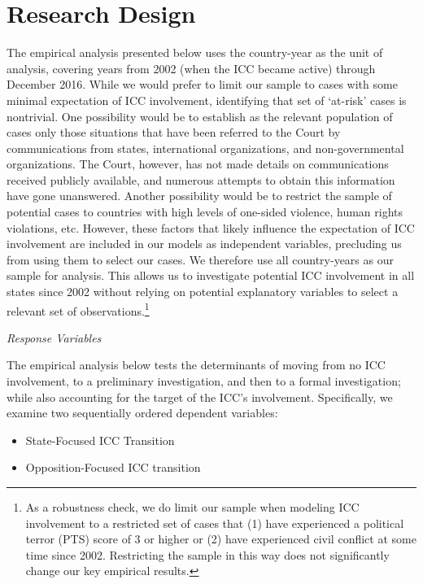 \section*{Research Design}

The empirical analysis presented below uses the country-year as the unit of analysis, covering years from 2002 (when the ICC became active) through December 2016.  While we would prefer to limit our sample to cases with some minimal expectation of ICC involvement, identifying that set of `at-risk' cases is nontrivial. One possibility would be to establish as the relevant population of cases only those situations that have been referred to the Court by communications from states, international organizations, and non-governmental organizations. The Court, however, has not made details on communications received publicly available, and numerous attempts to obtain this information have gone unanswered. Another possibility would be to restrict the sample of potential cases to countries with high levels of one-sided violence, human rights violations, etc. However, these factors that likely influence the expectation of ICC involvement are included in our models as independent variables, precluding us from using them to select our cases. We therefore use all country-years as our sample for analysis. This allows us to investigate potential ICC involvement in all states since 2002 without relying on potential explanatory variables to select a relevant set of observations.\footnote{As a robustness check, we do limit our sample when modeling ICC involvement to a restricted set of cases that (1) have experienced a political terror (PTS) score of 3 or higher or (2) have experienced civil conflict at some time since 2002. Restricting the sample in this way does not significantly change our key empirical results.}


\emph{Response Variables}

The empirical analysis below tests the determinants of moving from no ICC involvement, to a preliminary investigation, and then to a formal investigation; while also accounting for the target of the ICC's involvement. Specifically, we examine two sequentially ordered dependent variables: 

\begin{itemize}
	\item State-Focused ICC Transition
	\item Opposition-Focused ICC transition
\end{itemize}

